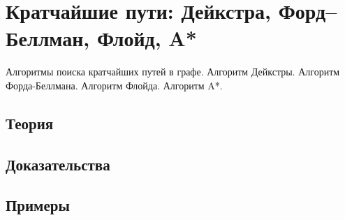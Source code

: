 
\section{Кратчайшие пути: Дейкстра, Форд–Беллман, Флойд, A*}
\label{sec:1.3.07-shortest-paths}

\begin{ticket}
Алгоритмы поиска кратчайших путей в графе. Алгоритм Дейкстры. Алгоритм Форда-Беллмана. Алгоритм Флойда. Алгоритм A*.
\end{ticket}

\subsection*{Теория}

\subsection*{Доказательства}

\subsection*{Примеры}
